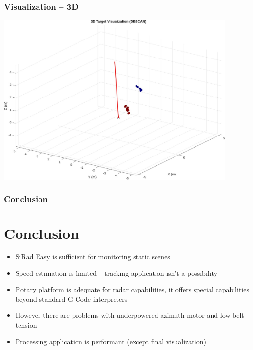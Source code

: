 \documentclass[aspectratio=43]{beamer}
\begin{document}
\begin{frame}[fragile]
  \frametitle{Visualization -- 3D}
	\begin{center}
  \includegraphics[width=0.9\textwidth]{../img/vis_3d.jpg}
	\end{center}
\end{frame}


\begin{frame}[fragile]
  \frametitle{Conclusion}
  \section{Conclusion}
  \begin{itemize}
    \item SiRad Easy is sufficient for monitoring static scenes
		\item Speed estimation is limited -- tracking application isn't a possibility
		\item Rotary platform is adequate for radar capabilities, it offers special capabilities beyond standard G-Code interpreters
		\item However there are problems with underpowered azimuth motor and low belt tension
		\item Processing application is performant (except final visualization)
  \end{itemize}
\end{frame}
\end{document}
